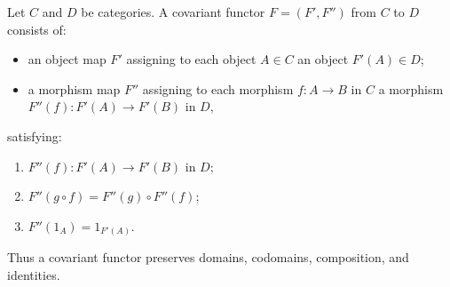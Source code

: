 Let $C$ and $D$ be categories. A covariant functor $F = (F', F'')$ from $C$ to $D$ consists of:
\begin{itemize}
\item an object map $F'$ assigning to each object $A \in C$ an object $F'(A) \in D$;
\item a morphism map $F''$ assigning to each morphism $f: A \to B$ in $C$ a morphism $F''(f): F'(A) \to F'(B)$ in $D$,
\end{itemize}
satisfying:
\begin{enumerate}
\item[(F.1)] $F''(f): F'(A) \to F'(B)$ in $D$;
\item[(F.2)] $F''(g \circ f) = F''(g) \circ F''(f)$;
\item[(F.3)] $F''(1_A) = 1_{F'(A)}$.
\end{enumerate}
Thus a covariant functor preserves domains, codomains, composition, and identities.
